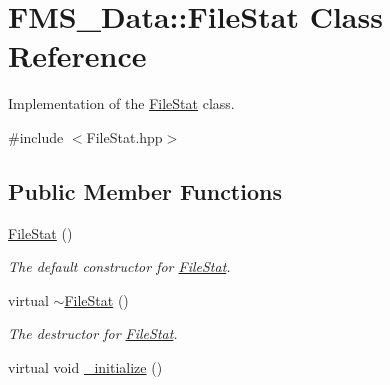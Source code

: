 \hypertarget{classFMS__Data_1_1FileStat}{
\section{FMS\_\-Data::FileStat Class Reference}
\label{classFMS__Data_1_1FileStat}
}


Implementation of the \hyperlink{classFMS__Data_1_1FileStat}{FileStat} class.  




{\ttfamily \#include $<$FileStat.hpp$>$}

\subsection*{Public Member Functions}
\begin{DoxyCompactItemize}
\item 
\hypertarget{classFMS__Data_1_1FileStat_a5e5a9f6a0cf1ba5a28431f28800834c2}{
\hyperlink{classFMS__Data_1_1FileStat_a5e5a9f6a0cf1ba5a28431f28800834c2}{FileStat} ()}
\label{classFMS__Data_1_1FileStat_a5e5a9f6a0cf1ba5a28431f28800834c2}

\begin{DoxyCompactList}\small\item\em The default constructor for \hyperlink{classFMS__Data_1_1FileStat}{FileStat}. \item\end{DoxyCompactList}\item 
\hypertarget{classFMS__Data_1_1FileStat_a5cadff2145079e76d788af114d96b3df}{
virtual \hyperlink{classFMS__Data_1_1FileStat_a5cadff2145079e76d788af114d96b3df}{$\sim$FileStat} ()}
\label{classFMS__Data_1_1FileStat_a5cadff2145079e76d788af114d96b3df}

\begin{DoxyCompactList}\small\item\em The destructor for \hyperlink{classFMS__Data_1_1FileStat}{FileStat}. \item\end{DoxyCompactList}\item 
\hypertarget{classFMS__Data_1_1FileStat_ad6507279812b5193b0484330f408e7a0}{
virtual void \hyperlink{classFMS__Data_1_1FileStat_ad6507279812b5193b0484330f408e7a0}{\_\-initialize} ()}
\label{classFMS__Data_1_1FileStat_ad6507279812b5193b0484330f408e7a0}


\end{DoxyCompactItemize}

